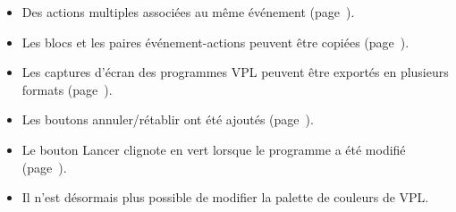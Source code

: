 \begin{itemize}

\item Des actions multiples associées au même événement (page~\pageref{p.multiple}).

\item Les blocs et les paires événement-actions peuvent être copiées (page~\pageref{p.copy-pairs}).

\item Les captures d'écran des programmes VPL peuvent être exportés en plusieurs formats (page~\pageref{p.proximity-sensitivity}).

\item Les boutons annuler/rétablir ont été ajoutés (page~\pageref{p.undo}).

\item Le bouton Lancer clignote en vert lorsque le programme a été modifié (page~\pageref{p.blink}).

\item Il n'est désormais plus possible de modifier la palette de couleurs de VPL.

\end{itemize}
